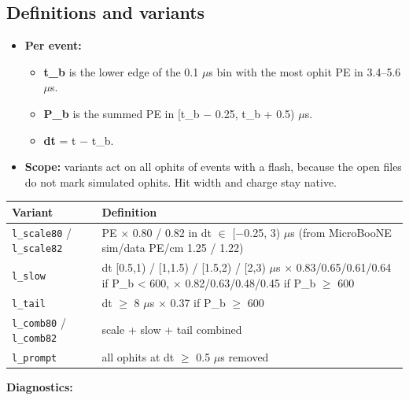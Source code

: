 \documentclass[10pt,a4paper]{article}
\begin{document}
\subsection{Definitions and variants}
\begin{itemize}
\item \textbf{Per event:}
\begin{itemize}
\item \textbf{t\_b} is the lower edge of the 0.1 $\mu$s bin with the most ophit PE in 3.4--5.6 $\mu$s.
\item \textbf{P\_b} is the summed PE in [t\_b $-$ 0.25, t\_b + 0.5) $\mu$s.
\item \textbf{dt} = t $-$ t\_b.
\end{itemize}
\item \textbf{Scope:} variants act on all ophits of events with a flash, because the open files do not mark simulated ophits. Hit width and charge stay native.
\end{itemize}
\begin{center}\small
\setlength{\tabcolsep}{3pt}\renewcommand{\arraystretch}{1.15}
\begin{tabularx}{\linewidth}{LL}
\toprule
\textbf{Variant} & \textbf{Definition} \\
\midrule
\texttt{l\_\allowbreak{}scale80} / \texttt{l\_\allowbreak{}scale82} & PE $\times$ 0.80 / 0.82 in dt $\in$ [$-$0.25, 3) $\mu$s (from MicroBooNE sim/data PE/cm 1.25 / 1.22) \\
\texttt{l\_\allowbreak{}slow} & dt [0.5,1) / [1,1.5) / [1.5,2) / [2,3) $\mu$s $\times$ 0.83/0.65/0.61/0.64 if P\_b < 600, $\times$ 0.82/0.63/0.48/0.45 if P\_b $\geq$ 600 \\
\texttt{l\_\allowbreak{}tail} & dt $\geq$ 8 $\mu$s $\times$ 0.37 if P\_b $\geq$ 600 \\
\texttt{l\_\allowbreak{}comb80} / \texttt{l\_\allowbreak{}comb82} & scale + slow + tail combined \\
\texttt{l\_\allowbreak{}prompt} & all ophits at dt $\geq$ 0.5 $\mu$s removed \\
\bottomrule
\end{tabularx}
\end{center}
\textbf{Diagnostics:}
\end{document}
